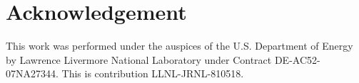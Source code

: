 \section*{Acknowledgement}

This work was performed under the auspices of the U.S. Department of Energy by Lawrence Livermore National Laboratory under Contract DE-AC52-07NA27344. This is contribution LLNL-JRNL-810518.
